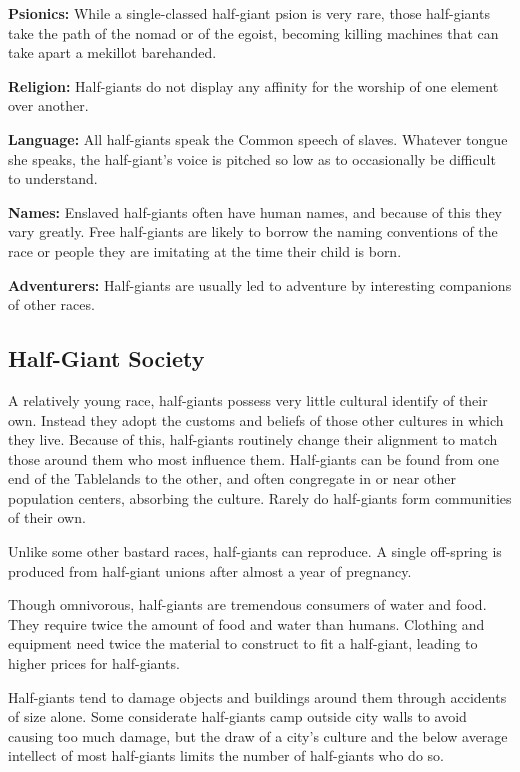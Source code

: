 \textbf{Psionics:} While a single-classed half-giant psion is very rare, those half-giants take the path of the nomad or of the egoist, becoming killing machines that can take apart a mekillot barehanded.

\textbf{Religion:} Half-giants do not display any affinity for the worship of one element over another.

\textbf{Language:} All half-giants speak the Common speech of slaves. Whatever tongue she speaks, the half-giant's voice is pitched so low as to occasionally be difficult to understand.

\textbf{Names:} Enslaved half-giants often have human names, and because of this they vary greatly. Free half-giants are likely to borrow the naming conventions of the race or people they are imitating at the time their child is born.

\textbf{Adventurers:} Half-giants are usually led to adventure by interesting companions of other races.

\subsection{Half-Giant Society}
A relatively young race, half-giants possess very little cultural identify of their own. Instead they adopt the customs and beliefs of those other cultures in which they live. Because of this, half-giants routinely change their alignment to match those around them who most influence them.
Half-giants can be found from one end of the Tablelands to the other, and often congregate in or near other population centers, absorbing the culture. Rarely do half-giants form communities of their own.

Unlike some other bastard races, half-giants can reproduce. A single off-spring is produced from half-giant unions after almost a year of pregnancy.

Though omnivorous, half-giants are tremendous consumers of water and food. They require twice the amount of food and water than humans. Clothing and equipment need twice the material to construct to fit a half-giant, leading to higher prices for half-giants.

Half-giants tend to damage objects and buildings around them through accidents of size alone. Some considerate half-giants camp outside city walls to avoid causing too much damage, but the draw of a city's culture and the below average intellect of most half-giants limits the number of half-giants who do so.

